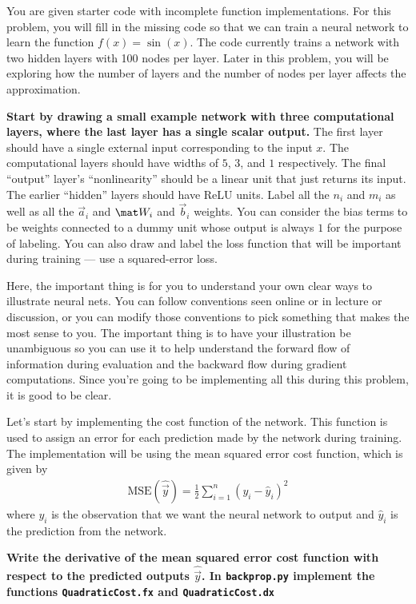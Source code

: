 \documentclass[preview]{standalone}
\begin{document}
You are given starter code with incomplete function implementations.  For this problem, you will fill in the missing code so that we can train a neural network to learn the function $f(x) = \sin(x)$.  The code currently trains a network with two hidden layers with 100 nodes per layer.  Later in this problem, you will be exploring how the number of layers and the number of nodes per layer affects the approximation.

\begin{Parts}
\Part
{\bf Start by drawing a small example network with three computational layers, where the last layer has a single scalar output.} The first layer should have a single external input corresponding to the input $x$. The computational layers should have widths of $5$, $3$, and $1$ respectively. The final ``output'' layer's ``nonlinearity'' should be a linear unit that just returns its input. The earlier ``hidden'' layers should have ReLU units. Label all the $n_i$ and $m_i$ as well as all the $\vec a_i$ and $\mat W_i$ and $\vec b_i$ weights. You can consider the bias terms to be weights connected to a dummy unit whose output is always $1$ for the purpose of labeling. You can also draw and label the loss function that will be important during training --- use a squared-error loss.

Here, the important thing is for you to understand your own clear ways to illustrate neural nets. You can follow conventions seen online or in lecture or discussion, or you can modify those conventions to pick something that makes the most sense to you. The important thing is to have your illustration be unambiguous so you can use it to help understand the forward flow of information during evaluation and the backward flow during gradient computations. Since you're going to be implementing all this during this problem, it is good to be clear.



\Part
Let's start by implementing the cost function of the network.  This function is used to assign an error for each prediction made by the network during training.  The implementation will be using the mean squared error cost function, which is given by
\begin{align*}
\text{MSE}(\hat{\vec{y}})=\frac{1}{2}\sum_{i=1}^n( y_i - \hat{y}_i)^2
\end{align*}
where $y_i$ is the observation that we want the neural network to output and $\hat{y}_i$ is the prediction from the network.

\textbf{Write the derivative of the mean squared error cost function with respect to the predicted outputs $\hat{\vec{y}}$.  In \texttt{backprop.py} implement the functions \texttt{QuadraticCost.fx} and \texttt{QuadraticCost.dx}}




\end{Parts}
\end{document}
